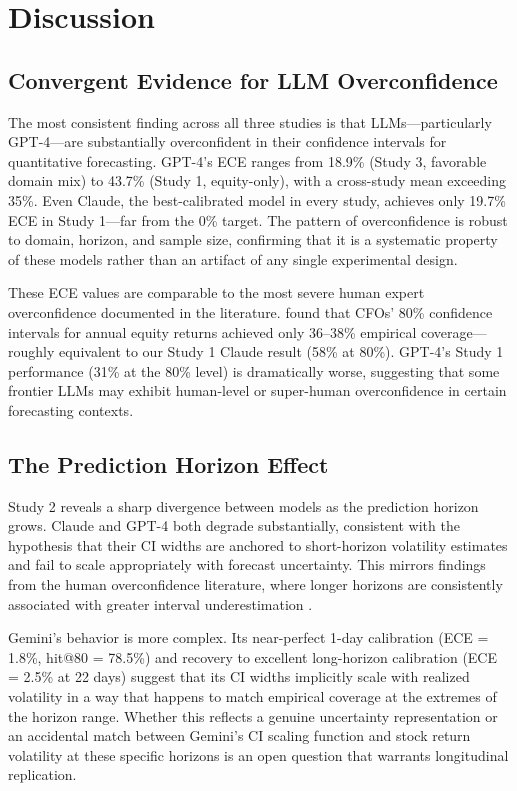 \section{Discussion}
\label{sec:discussion}

\subsection{Convergent Evidence for LLM Overconfidence}
\label{sec:discussion-convergent}

The most consistent finding across all three studies is that LLMs---particularly
GPT-4---are substantially overconfident in their confidence intervals for quantitative
forecasting. GPT-4's ECE ranges from 18.9\% (Study 3, favorable domain mix) to 43.7\%
(Study 1, equity-only), with a cross-study mean exceeding 35\%. Even Claude, the
best-calibrated model in every study, achieves only 19.7\% ECE in Study 1---far from
the 0\% target. The pattern of overconfidence is robust to domain, horizon, and sample
size, confirming that it is a systematic property of these models rather than an
artifact of any single experimental design.

These ECE values are comparable to the most severe human expert overconfidence
documented in the literature. \citet{BenDavid2013} found that CFOs' 80\% confidence
intervals for annual equity returns achieved only 36--38\% empirical coverage---roughly
equivalent to our Study 1 Claude result (58\% at 80\%). GPT-4's Study 1 performance
(31\% at the 80\% level) is dramatically worse, suggesting that some frontier LLMs may
exhibit human-level or super-human overconfidence in certain forecasting contexts.

\subsection{The Prediction Horizon Effect}
\label{sec:discussion-horizon}

Study 2 reveals a sharp divergence between models as the prediction horizon grows.
Claude and GPT-4 both degrade substantially, consistent with the hypothesis that their
CI widths are anchored to short-horizon volatility estimates and fail to scale
appropriately with forecast uncertainty. This mirrors findings from the human
overconfidence literature, where longer horizons are consistently associated with
greater interval underestimation \citep{Griffin1992}.

Gemini's behavior is more complex. Its near-perfect 1-day calibration (ECE = 1.8\%,
hit@80 = 78.5\%) and recovery to excellent long-horizon calibration (ECE = 2.5\% at
22 days) suggest that its CI widths implicitly scale with realized volatility in a way
that happens to match empirical coverage at the extremes of the horizon range. Whether
this reflects a genuine uncertainty representation or an accidental match between
Gemini's CI scaling function and stock return volatility at these specific horizons
is an open question that warrants longitudinal replication.

